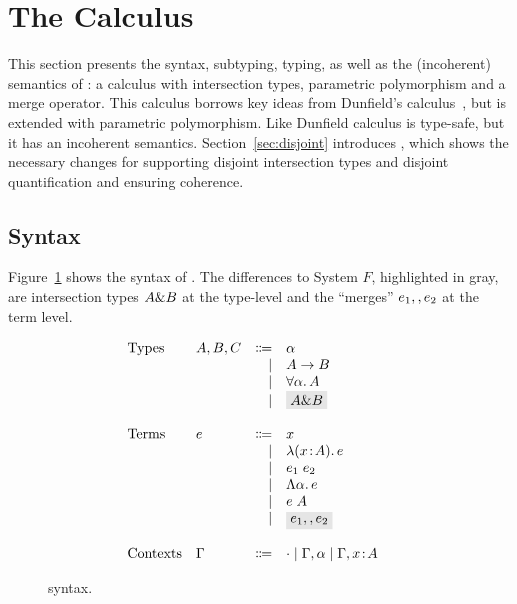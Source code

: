 \section{The \name Calculus}
\label{sec:fi}

This section presents the syntax, subtyping, typing, as well as the
(incoherent) semantics of \name: a calculus with intersection types,
parametric polymorphism and a merge
operator. This calculus borrows key ideas from Dunfield's
calculus~\cite{dunfield2014elaborating}, but is extended with parametric polymorphism. Like Dunfield calculus
\name is type-safe, but it has an incoherent semantics.
Section~\ref{sec:disjoint} introduces \namedis, which shows the necessary changes
for supporting disjoint intersection types and disjoint
quantification and ensuring coherence.

\subsection{Syntax}

Figure~\ref{fig:fi-syntax} shows the syntax of \name. The differences to
System $F$, highlighted in gray, are intersection types $A \& B$ at the
type-level and the ``merges'' $e_1 ,, e_2$ at the term level.

\begin{figure}
  \[
    \begin{array}{l}
      \begin{array}{llrll}
        \text{Types}
        & A, B, C & \Coloneqq & \alpha    & \\
        &      & \mid & A \to B        & \\
        &      & \mid & \for \alpha A  & \\
        &      & \mid & \highlight{$A \inter B$}  & \\

        \\
        \text{Terms}
        & e & \Coloneqq & x            & \\
        &   & \mid & \lamty x A e      & \\
        &   & \mid & \app {e_1} {e_2}  & \\
        &   & \mid & \blam \alpha e    & \\
        &   & \mid & \tapp e A         & \\
        &   & \mid & \highlight{$e_1 \mergeop e_2$}  & \\

        \\
        \text{Contexts}
        & \Gamma & \Coloneqq & \cdot
                   \mid \Gamma, \alpha
                   \mid \Gamma, x \oftype A  & \\
      \end{array}
    \end{array}
  \]

  \caption{\name syntax.}
  \label{fig:fi-syntax}
\end{figure}

